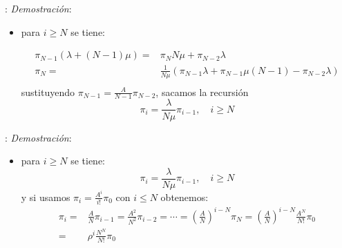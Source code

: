\documentclass[xcolor={x11names}]{beamer}
\begin{document}
\begin{frame}{\secname: \subsecname}
    \textit{Demostración}:
    \begin{itemize}
        \item para $i\geq N$ se tiene:
        \begin{figure}
            \resizebox{!}{.2\textwidth}{%
                
            }
        \end{figure}
        \begin{align*}
            \pi_{N-1}(\lambda+(N-1)\mu)
            =&\pi_N N\mu + \pi_{N-2}\lambda\\
            \pi_{N}
            =& \frac{1}{N\mu}
            \left(
                \pi_{N-1}\lambda
                + \pi_{N-1}\mu(N-1)
                - \pi_{N-2}\lambda
            \right)\\
        \end{align*}
        sustituyendo $\pi_{N-1}=\tfrac{A}{N-1}
        \pi_{N-2}$, sacamos la recursión
        \begin{equation*}
            \pi_i=\frac{\lambda}{N\mu}\pi_{i-1},
            \quad i\geq N
        \end{equation*}
    \end{itemize}
\end{frame}

\begin{frame}{\secname: \subsecname}
    \textit{Demostración}:
    \begin{itemize}
        \item para $i\geq N$ se tiene:
        \begin{equation*}
            \pi_i=\frac{\lambda}{N\mu}\pi_{i-1},
            \quad i\geq N
        \end{equation*}
        y si usamos $\pi_i=\tfrac{A^i}{i!}\pi_0$
        con $i\leq N$ obtenemos:
        \begin{align*}
            \pi_{i}=&\frac{A}{N}\pi_{i-1}
            =\frac{A^2}{N^2}\pi_{i-2}=
            \cdots
            = \left(
                \frac{A}{N}
            \right)^{i-N}
            \pi_N
            = \left(
                \frac{A}{N}
            \right)^{i-N}
            \frac{A^N}{N!}\pi_0\\
            =& \rho^i \frac{N^N}{N!}\pi_0
        \end{align*}
    \end{itemize}
\end{frame}
\end{document}
